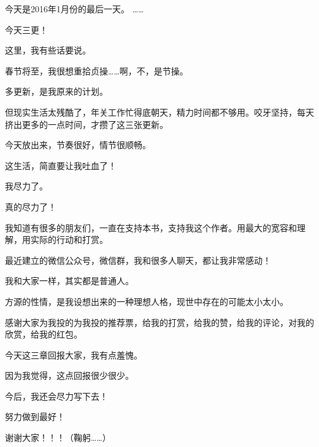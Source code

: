 \begin{this_body}
今天是2016年1月份的最后一天。  ……

今天三更！

这里，我有些话要说。

春节将至，我很想重拾贞操……啊，不，是节操。

多更新，是我原来的计划。

但现实生活太残酷了，年关工作忙得底朝天，精力时间都不够用。咬牙坚持，每天挤出更多的一点时间，才攒了这三张更新。

今天放出来，节奏很好，情节很顺畅。

这生活，简直要让我吐血了！

我尽力了。

真的尽力了！

我知道有很多的朋友们，一直在支持本书，支持我这个作者。用最大的宽容和理解，用实际的行动和打赏。

最近建立的微信公众号，微信群，我和很多人聊天，都让我非常感动！

我和大家一样，其实都是普通人。

方源的性情，是我设想出来的一种理想人格，现世中存在的可能太小太小。

感谢大家为我投的为我投的推荐票，给我的打赏，给我的赞，给我的评论，对我的欣赏，给我的红包。

今天这三章回报大家，我有点羞愧。

因为我觉得，这点回报很少很少。

今后，我还会尽力写下去！

努力做到最好！

谢谢大家！！！（鞠躬……）

\end{this_body}

